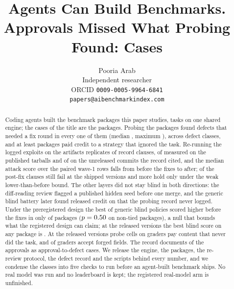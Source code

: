\documentclass{article}
\title{Agents Can Build Benchmarks. Approvals Missed What Probing Found: \suitePackages{} Cases}
\author{%
  Pooria Arab\\
  Independent researcher\\
  ORCID \texttt{0009-0005-9964-6841}\\
  \texttt{papers@aibenchmarkindex.com}\\
}
\begin{document}
\maketitle

\begin{abstract}
Coding agents built the \suitePackages{} benchmark packages this paper studies, \suiteTasks{} tasks on one shared engine; the \suitePackages{} cases of the title are the packages. Probing the packages found defects that needed a fix round in every one of them (median \reviewRoundsMedian{}, maximum \reviewRoundsMax{}), across  defect classes, and at least  packages paid credit to a strategy that ignored the task. Re-running the logged exploits on the artifacts replicates \expExplReplicated{} of \expExplRecordClauses{} record clauses, \expExplReplReleased{} of \expExplRecordReleased{} measured on the published tarballs and \expExplReplCommit{} of \expExplRecordCommit{} on the unreleased commits the record cited, and the median attack score over the \expExplAtkPairs{} paired wave-1 rows falls from \expExplAtkMedianOldPaired{} before the fixes to \expExplAtkMedianNewPaired{} after; \expExplFixFails{} of the \expExplPostfixClauses{} post-fix clauses still fail at the shipped versions and \expExplFixHoldsWeak{} more hold only under the weak lower-than-before bound. The other layers did not stay blind in both directions: the diff-reading review flagged a published hidden seed before one merge, and the generic blind battery later found released credit on \expTrivialReleasedMaxPkgs{} that the probing record never logged. Under the preregistered design the best of \trivialPolicies{} generic blind policies scored higher before the fixes in only \trivialHigherOld{} of \trivialPackages{} packages ($p = 0.50{}$ on \trivialSignN{} non-tied packages), a null that bounds what the registered design can claim; at the released versions the best blind score on any package is \expTrivialReleasedMax{}. At the released versions \expProbesCreditFailCells{} probe cells on \expProbesCreditFailPkgCount{} graders pay content that never did the task, and \expProbesForgedAccepted{} of \expPackages{} graders accept forged fields. The record documents \approvalDefectCases{} of the \councilMergedApproved{} approvals as approval-to-defect cases. We release the engine, the packages, the re-review protocol, the defect record and the scripts behind every number, and we condense the classes into five checks to run before an agent-built benchmark ships. No real model was run and no leaderboard is kept; the registered real-model arm is unfinished.
\end{abstract}
\end{document}
